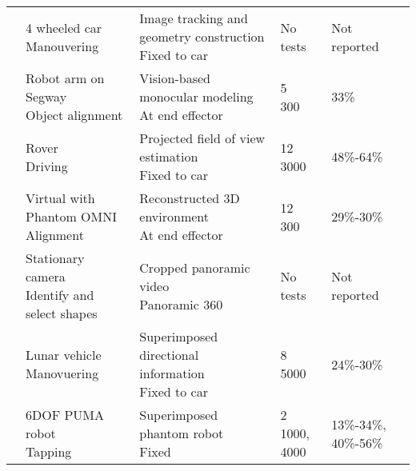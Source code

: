 \begin{table}[]
{\begin{tabular}{@{}lllll@{}}
	\addlinespace
	\cite{Hu2015}            & \makecell[l]{4 wheeled car\\ Manouvering}                    & \makecell[l]{Image tracking and geometry construction\\ Fixed to car}     & No tests                                                     & Not reported         \\
	\addlinespace
	\cite{Lovi2010}          & \makecell[l]{Robot arm on Segway\\ Object alignment}         & \makecell[l]{Vision-based monocular modeling\\ At end effector}           & \makecell[l]{5\\ 300}            & 33\%                 \\
	\addlinespace
	\cite{Matheson2013}      & \makecell[l]{Rover\\ Driving}                                & \makecell[l]{Projected field of view estimation\\ Fixed to car}           & \makecell[l]{12\\ 3000}          & 48\%-64\%            \\
	\addlinespace
	\cite{Rachmielowski2010} & \makecell[l]{Virtual with Phantom OMNI\\ Alignment}          & \makecell[l]{Reconstructed 3D environment\\ At end effector}              & \makecell[l]{12\\ 300}           & 29\%-30\%            \\
	\addlinespace
	\cite{Baldwin1999}       & \makecell[l]{Stationary camera\\ Identify and select shapes} & \makecell[l]{Cropped panoramic video\\ Panoramic 360}                     & No tests                                                     & Not reported         \\
	\addlinespace
	\cite{Mathan1996}        & \makecell[l]{Lunar vehicle\\ Manovuering}                    & \makecell[l]{Superimposed directional information\\ Fixed to car}         & \makecell[l]{8\\ 5000}           & 24\%-30\%            \\
	\addlinespace
	\cite{Bejczy1990}        & \makecell[l]{6DOF PUMA robot\\ Tapping}                      & \makecell[l]{Superimposed phantom robot\\ Fixed}                          & \makecell[l]{2\\ 1000, 4000}     & 13\%-34\%, 40\%-56\% \\ \bottomrule
	\end{tabular}
}
\end{table}